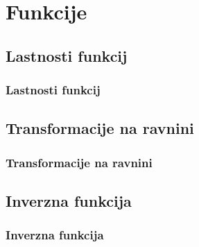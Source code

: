\section{Funkcije}

\begin{frame}
    \sectionpage
\end{frame}

\begin{frame}
\end{frame}


    \subsection{Lastnosti funkcij}

        \begin{frame}
            \frametitle{Lastnosti funkcij}
        \end{frame}

    \subsection{Transformacije na ravnini}

        \begin{frame}
            \frametitle{Transformacije na ravnini}
        \end{frame}

    \subsection{Inverzna funkcija}

        \begin{frame}
            \frametitle{Inverzna funkcija}
        \end{frame}


